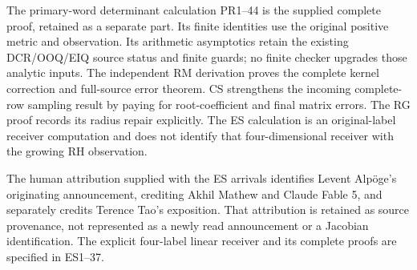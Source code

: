 \documentclass[11pt]{article}
\begin{document}
The primary-word determinant calculation PR1--44 is the supplied complete proof, retained as a separate part. Its finite identities use the original positive metric and observation. Its arithmetic asymptotics retain the existing DCR/OOQ/EIQ source status and finite guards; no finite checker upgrades those analytic inputs. The independent RM derivation proves the complete kernel correction and full-source error theorem. CS strengthens the incoming complete-row sampling result by paying for root-coefficient and final matrix errors. The RG proof records its radius repair explicitly. The ES calculation is an original-label receiver computation and does not identify that four-dimensional receiver with the growing RH observation.

The human attribution supplied with the ES arrivals identifies Levent Alpöge's originating announcement, crediting Akhil Mathew and Claude Fable 5, and separately credits Terence Tao's exposition. That attribution is retained as source provenance, not represented as a newly read announcement or a Jacobian identification. The explicit four-label linear receiver and its complete proofs are specified in ES1--37.
\end{document}

